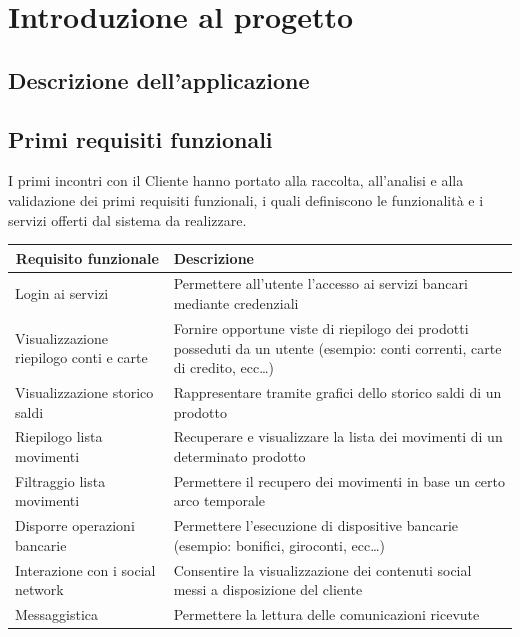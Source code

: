 \chapter{Introduzione al progetto}

\section{Descrizione dell'applicazione}



\section{Primi requisiti funzionali}
I primi incontri con il Cliente hanno portato alla raccolta, all'analisi e alla validazione dei primi requisiti funzionali, i quali definiscono le funzionalità e i servizi 
offerti dal sistema da realizzare.

\begin{center}
   
    \begin{tabular}{p{6cm}|p{8cm}}

    \toprule
    \multicolumn{1}{c}{\textbf{Requisito funzionale}} &
    \textbf{Descrizione}\\

    \midrule
    Login ai servizi & Permettere all'utente l'accesso ai servizi bancari mediante credenziali \\
    Visualizzazione riepilogo conti e carte & Fornire opportune viste di riepilogo dei prodotti posseduti da un utente (esempio: conti correnti, carte di credito, ecc\dots)\\
    Visualizzazione storico saldi & Rappresentare tramite grafici dello storico saldi di un prodotto\\
    Riepilogo lista movimenti & Recuperare e visualizzare la lista dei movimenti di un determinato prodotto\\
    Filtraggio lista movimenti & Permettere il recupero dei movimenti in base un certo arco temporale\\
    Disporre operazioni bancarie & Permettere l'esecuzione di dispositive bancarie (esempio: bonifici, giroconti, ecc\dots) \\
    Interazione con i social network & Consentire la visualizzazione dei contenuti social messi a disposizione del cliente\\
    Messaggistica & Permettere la lettura delle comunicazioni ricevute  \\
    \bottomrule

    \end{tabular}
        \label{tab:requisiti_iniziali}

\end{center}



